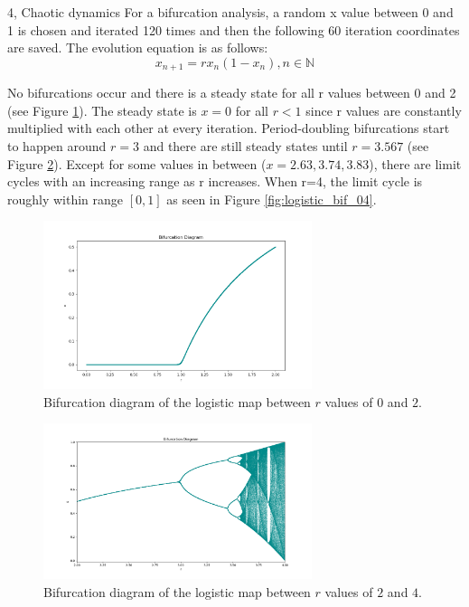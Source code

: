\documentclass[10pt,a4paper]{article}
\begin{document}
\begin{task}{4, Chaotic dynamics}
For a bifurcation analysis, a random x value between 0 and 1 is chosen and iterated 120 times and then the following 60 iteration coordinates are saved. The evolution equation is as follows: \\
\begin{equation}
    x_{n+1}= r x_n (1 - x_n), n \in \mathbb{N}
\end{equation}

No bifurcations occur and there is a steady state for all r values between 0 and 2 (see Figure \ref{fig:logistic_bif_02}). The steady state is $x=0$ for all $r<1$ since r values are constantly multiplied with each other at every iteration. Period-doubling bifurcations start to happen around $r=3$ and there are still steady states until $r=3.567$ (see Figure \ref{fig:logistic_bif_24}). Except for some values in between ($x = 2.63, 3.74, 3.83$), there are limit cycles with an increasing range as r increases. When r=4, the limit cycle is roughly within range $[0, 1]$ as seen in Figure \ref{fig:logistic_bif_04}. \\

\begin{figure}[H]
    \centering
    \includegraphics[width=0.7\textwidth]{../plots/logistic_bif_0-2.png}
    \caption{Bifurcation diagram of the logistic map between $r$ values of $0$ and $2$.}
    \label{fig:logistic_bif_02}
\end{figure}

\begin{figure}[H]
    \centering
    \includegraphics[width=0.7\textwidth]{../plots/logistic_bif_2-4.png}
    \caption{Bifurcation diagram of the logistic map between $r$ values of $2$ and $4$.}
    \label{fig:logistic_bif_24}
\end{figure}


\end{task}
\end{document}
